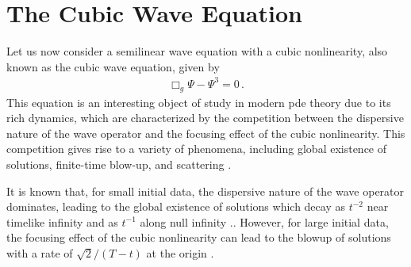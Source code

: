 \section{The Cubic Wave Equation}
\label{section:cubic_wave_equation}

Let us now consider a semilinear wave equation with a cubic nonlinearity, also known as the cubic wave equation, given by
%
\begin{align}
    \Box_g \Psi - \Psi^3 = 0 \, .
    \label{eq:cubic_wave_equation_simple}
\end{align}
%
This equation is an interesting object of study in modern \acrshort{pde} theory due to its rich dynamics, which are characterized by the competition between the dispersive nature of the wave operator and the focusing effect of the cubic nonlinearity. This competition gives rise to a variety of phenomena, including global existence of solutions, finite-time blow-up, and scattering \cite{Universality_of_global_dynamics_for_the_cubic_wave_equation,A_hyperboloidal_method_for_numerical_simulations_of_multidimensional_nonlinear_wave_equations}. 

It is known that, for small initial data, the dispersive nature of the wave operator dominates, leading to the global existence of solutions which decay as $t^{-2}$ near timelike infinity and as $t^{-1}$ along null infinity \cite{Universality_of_global_dynamics_for_the_cubic_wave_equation}.. However, for large initial data, the focusing effect of the cubic nonlinearity can lead to the blowup of solutions with a rate of $\sqrt{2}/(T-t)$ at the origin \cite{Universality_of_global_dynamics_for_the_cubic_wave_equation}.

